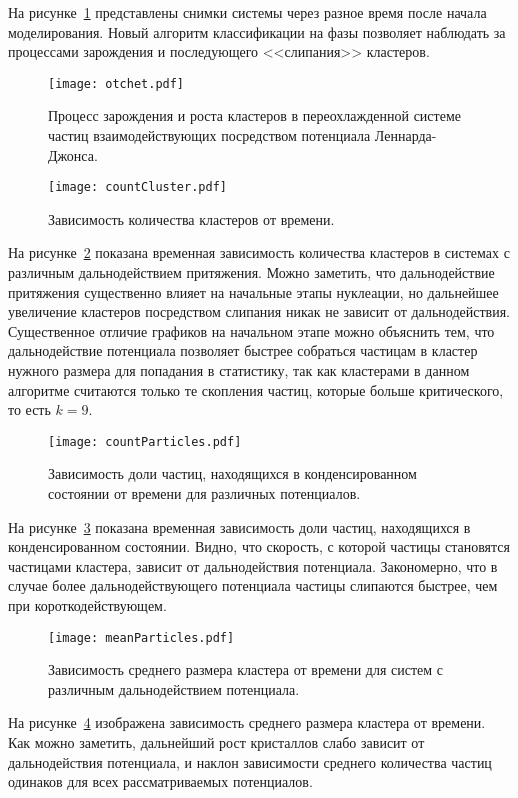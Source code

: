 На рисунке~\ref{otchet} представлены снимки системы через разное время после начала моделирования. Новый алгоритм классификации на фазы позволяет наблюдать за процессами зарождения и последующего <<слипания>> кластеров.



\begin{figure}[!t]
	 \centering
	 \texttt{[image: otchet.pdf]}
	 \caption{Процесс зарождения и роста кластеров в переохлажденной системе частиц взаимодействующих посредством потенциала Леннарда-Джонса.}
	 \label{otchet}
\end{figure}


\begin{figure}[!t]
    \centering
    \texttt{[image: countCluster.pdf]}
    \caption{Зависимость количества кластеров от времени.}
    \label{countCluster}
\end{figure}

На рисунке~\ref{countCluster} показана временная зависимость количества кластеров в системах с различным дальнодействием притяжения. Можно заметить, что дальнодействие притяжения существенно влияет на начальные этапы нуклеации, но дальнейшее увеличение кластеров посредством слипания никак не зависит от дальнодействия. Существенное отличие графиков на начальном этапе можно объяснить тем, что дальнодействие потенциала позволяет быстрее собраться частицам в кластер нужного размера для попадания в статистику, так как кластерами в данном алгоритме считаются только те скопления частиц, которые больше критического, то есть $k = 9$.

\begin{figure}[!t]
    \centering
    \texttt{[image: countParticles.pdf]}
    \caption{Зависимость доли частиц, находящихся в конденсированном состоянии от времени для различных потенциалов.}
    \label{countParticles}
\end{figure}

На рисунке~\ref{countParticles} показана временная зависимость доли частиц, находящихся в конденсированном состоянии. Видно, что скорость, с которой частицы становятся частицами кластера, зависит от дальнодействия потенциала. Закономерно, что в случае более дальнодействующего потенциала частицы слипаются быстрее, чем при короткодействующем.

\begin{figure}[!t]
    \centering
    \texttt{[image: meanParticles.pdf]}
    \caption{Зависимость среднего размера кластера от времени для систем с различным дальнодействием потенциала.}
    \label{meanParticles}
\end{figure}

На рисунке~\ref{meanParticles} изображена зависимость среднего размера кластера от времени. Как можно заметить, дальнейший рост кристаллов слабо зависит от дальнодействия потенциала, и наклон зависимости среднего количества частиц одинаков для всех рассматриваемых потенциалов.

